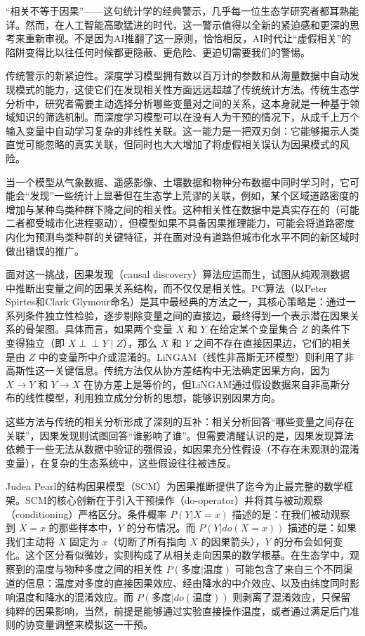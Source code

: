 \documentclass[
  twoside,12pt,fontset=none]{ctexbook}
\begin{document}
``相关不等于因果''------这句统计学的经典警示，几乎每一位生态学研究者都耳熟能详。然而，在人工智能高歌猛进的时代，这一警示值得以全新的紧迫感和更深的思考来重新审视。不是因为AI推翻了这一原则，恰恰相反，AI时代让``虚假相关''的陷阱变得比以往任何时候都更隐蔽、更危险、更迫切需要我们的警惕。

传统警示的新紧迫性。深度学习模型拥有数以百万计的参数和从海量数据中自动发现模式的能力，这使它们在发现相关性方面远远超越了传统统计方法。传统生态学分析中，研究者需要主动选择分析哪些变量对之间的关系，这本身就是一种基于领域知识的筛选机制。而深度学习模型可以在没有人为干预的情况下，从成千上万个输入变量中自动学习复杂的非线性关联。这一能力是一把双刃剑：它能够揭示人类直觉可能忽略的真实关联，但同时也大大增加了将虚假相关误认为因果模式的风险。

当一个模型从气象数据、遥感影像、土壤数据和物种分布数据中同时学习时，它可能会``发现''一些统计上显著但在生态学上荒谬的关联，例如，某个区域道路密度的增加与某种鸟类种群下降之间的相关性。这种相关性在数据中是真实存在的（可能二者都受城市化进程驱动），但模型如果不具备因果推理能力，可能会将道路密度内化为预测鸟类种群的关键特征，并在面对没有道路但城市化水平不同的新区域时做出错误的推广。

面对这一挑战，因果发现（causal discovery）算法应运而生，试图从纯观测数据中推断出变量之间的因果关系结构，而不仅仅是相关性。PC算法（以Peter Spirtes和Clark Glymour命名）是其中最经典的方法之一，其核心策略是：通过一系列条件独立性检验，逐步剔除变量之间的直接边，最终得到一个表示潜在因果关系的骨架图。具体而言，如果两个变量 \(X\) 和 \(Y\) 在给定某个变量集合 \(Z\) 的条件下变得独立（即 \(X \perp\!\!\!\perp Y \mid Z\)），那么 \(X\) 和 \(Y\) 之间不存在直接因果边，它们的相关是由 \(Z\) 中的变量所中介或混淆的。LiNGAM（线性非高斯无环模型）则利用了非高斯性这一关键信息。传统方法仅从协方差结构中无法确定因果方向，因为 \(X \to Y\) 和 \(Y \to X\) 在协方差上是等价的，但LiNGAM通过假设数据来自非高斯分布的线性模型，利用独立成分分析的思想，能够识别因果方向。

这些方法与传统的相关分析形成了深刻的互补：相关分析回答``哪些变量之间存在关联''，因果发现则试图回答``谁影响了谁''。但需要清醒认识的是，因果发现算法依赖于一些无法从数据中验证的强假设，如因果充分性假设（不存在未观测的混淆变量），在复杂的生态系统中，这些假设往往被违反。

Judea Pearl的结构因果模型（SCM）为因果推断提供了迄今为止最完整的数学框架。SCM的核心创新在于引入干预操作（do-operator）并将其与被动观察（conditioning）严格区分。条件概率 \(P(Y | X = x)\) 描述的是：在我们被动观察到 \(X = x\) 的那些样本中，\(Y\) 的分布情况。而 \(P(Y | do(X = x))\) 描述的是：如果我们主动将 \(X\) 固定为 \(x\)（切断了所有指向 \(X\) 的因果箭头），\(Y\) 的分布会如何变化。这个区分看似微妙，实则构成了从相关走向因果的数学根基。在生态学中，观察到的温度与物种多度之间的相关性 \(P(\text{多度} | \text{温度})\) 可能包含了来自三个不同渠道的信息：温度对多度的直接因果效应、经由降水的中介效应、以及由纬度同时影响温度和降水的混淆效应。而 \(P(\text{多度} | do(\text{温度}))\) 则剥离了混淆效应，只保留纯粹的因果影响，当然，前提是能够通过实验直接操作温度，或者通过满足后门准则的协变量调整来模拟这一干预。
\end{document}
